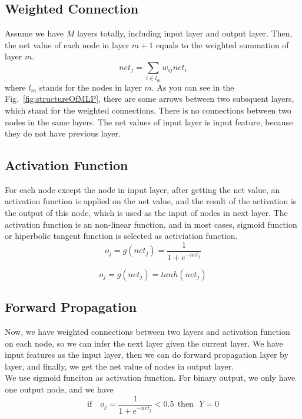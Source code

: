 \documentclass[11pt,letterpaper]{article}
\begin{document}
\subsection{Weighted Connection}
Assume we have $M$ layers totally, including input layer and output layer. Then, the net value of each node in layer $m+1$ equals to the weighted summation of layer $m$. 
\begin{equation}
\label{eqn:netvalue}
net_j = \sum_{i \in l_m}w_{ij}net_i
\end{equation}
where $l_m$ stands for the nodes in layer $m$. As you can see in the Fig.~\ref{fig:structureOfMLP}, there are some arrows between two subsquent layers, which stand for the weighted connections. There is no connections between two nodes in the same layers. The net values of input layer is input feature, because they do not have previous layer.

\subsection{Activation Function}
For each node except the node in input layer, after getting the net value, an activation function is applied on the net value, and the result of the activation is the output of this node, which is used as the input of nodes in next layer. The activation function is an non-linear function, and in most cases, sigmoid function or hiperbolic tangent function is selected as activiation function. 
\begin{equation}
\label{eqn:sigmoid}
o_j = g(net_j) = \frac{1}{1+e^{-net_j}}
\end{equation}

\begin{equation}
\label{eqn:tanh}
o_j = g(net_j) = tanh(net_j)
\end{equation}

\subsection{Forward Propagation}
Now, we have weighted connections between two layers and activation function on each node, so we can infer the next layer given the current layer. We have input features as the input layer, then we can do forward propagation layer by layer, and finally, we get the net value of nodes in output layer. \\
We use sigmoid funciton as activation function. For binary output, we only have one output node, and we have 
\begin{equation}
\label{eqn:YEquals0}
\text{if ~~} o_j = \frac{1}{1+e^{-net_j}} < 0.5 ~~\text{then~~} Y=0
\end{equation}
\end{document}

